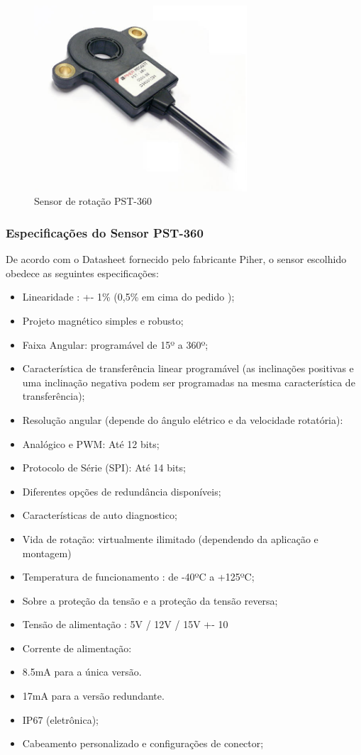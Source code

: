 \begin{figure}[h]
  \centering
  \includegraphics[width=300px, scale=1]{figuras/pst}
  \caption{ Sensor de rotação PST-360}
\label{fig:pst}
\end{figure}

\subsubsection{Especificações do Sensor PST-360}

De acordo com o Datasheet \cite{sensor_rotacao} fornecido pelo fabricante Piher, o sensor escolhido
obedece as seguintes especificações:

\begin{itemize}
  \item Linearidade : +- 1\% (0,5\% em cima do pedido );
  \item Projeto magnético simples e robusto;
  \item Faixa Angular: programável de 15º a 360º;
  \item Característica de transferência linear programável (as inclinações positivas e
  uma inclinação negativa podem ser programadas na mesma característica de transferência);

  \item Resolução angular (depende do ângulo elétrico e da velocidade rotatória):
  \item Analógico e PWM: Até 12 bits;
  \item Protocolo de Série (SPI): Até 14 bits;
  \item Diferentes opções de redundância disponíveis;
  \item Características de auto diagnostico;
  \item Vida de rotação: virtualmente ilimitado (dependendo da aplicação e montagem)
  \item Temperatura de funcionamento : de -40ºC a +125ºC;
  \item Sobre a proteção da tensão e a proteção da tensão reversa;
  \item Tensão de alimentação : 5V / 12V / 15V +- 10%
  \item Corrente de alimentação:
  \item 8.5mA para a única versão.
  \item 17mA para a versão redundante.
  \item IP67 (eletrônica);
  \item Cabeamento personalizado e configurações de conector;
\end{itemize}

